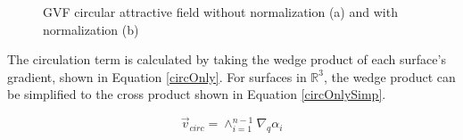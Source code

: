 \documentclass[numbered,pdftex]{ohio-etd}
\begin{document}
\begin{figure}[H]
	\begin{subfigmatrix}{2}%
		\centering	
		\hspace*{0mm}
	\end{subfigmatrix}
	\caption{GVF circular attractive field without normalization (a) and with normalization (b)}
	\label{fig:gvfCircAttractive}
\end{figure}

The circulation term is calculated by taking the wedge product of each surface's gradient, shown in Equation \ref{circOnly}. For surfaces in $\mathbb{R}^3$, the wedge product can be simplified to the cross product shown in Equation \ref{circOnlySimp}.

\begin{equation}
\vec{v}_{circ} =  \wedge_{i=1}^{n-1}\nabla_q\alpha_i 
\label{circOnly}
\end{equation}
\end{document}
